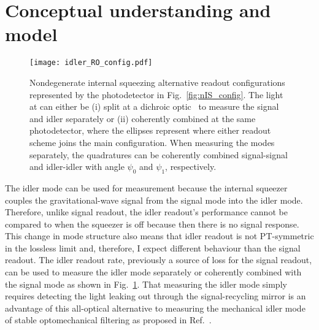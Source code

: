 \section{Conceptual understanding and model}
\label{sec:nIS_idlerRO_model}

\begin{figure}
    \centering
    \texttt{[image: idler\_RO\_config.pdf]}
    \caption{Nondegenerate internal squeezing alternative readout configurations represented by the photodetector in Fig.~\ref{fig:nIS_config}. The light at can either be (i) split at a dichroic optic~\cite{} to measure the signal and idler separately or (ii) coherently combined at the same photodetector, where the ellipses represent where either readout scheme joins the main configuration. When measuring the modes separately, the quadratures can be coherently combined signal-signal and idler-idler with angle $\psi_0$ and $\psi_1$, respectively.}
    \label{fig:idler_RO_config}
\end{figure}

The idler mode can be used for measurement because the internal squeezer couples the gravitational-wave signal from the signal mode into the idler mode. Therefore, unlike signal readout, the idler readout's performance cannot be compared to when the squeezer is off because then there is no signal response. This change in mode structure also means that idler readout is not PT-symmetric in the lossless limit  and, therefore, I expect different behaviour than the signal readout. The idler readout rate, previously a source of loss for the signal readout, can be used to measure the idler mode separately or coherently combined with the signal mode as shown in Fig.~\ref{fig:idler_RO_config}. That measuring the idler mode simply requires detecting the light leaking out through the signal-recycling mirror is an advantage of this all-optical alternative to measuring the mechanical idler mode of stable optomechanical filtering as proposed in Ref.~\cite{liEnhancingInterferometerSensitivity2021}.

